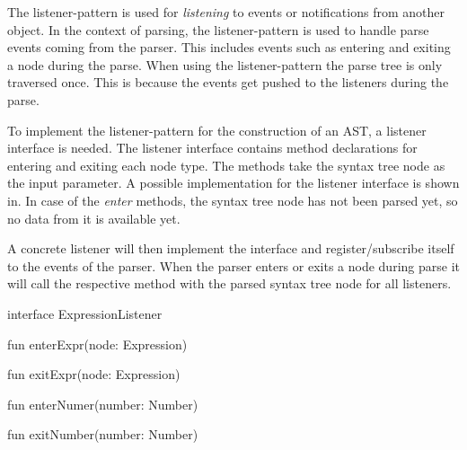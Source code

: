 The listener-pattern is used for \textit{listening} to events or notifications from another object. In the context of parsing, the listener-pattern is used to handle parse events coming from the parser. This includes events such as entering and exiting a node during the parse. When using the listener-pattern the parse tree is only traversed once. This is because the events get pushed to the listeners during the parse. 

To implement the listener-pattern for the construction of an AST, a listener interface is needed. The listener interface contains method declarations for entering and exiting each node type. The methods take the syntax tree node as the input parameter. A possible implementation for the listener interface is shown in.  In case of the \textit{enter} methods, the syntax tree node has not been parsed yet, so no data from it is available yet.

A concrete listener will then implement the interface and register/subscribe itself to the events of the parser. When the parser enters or exits a node during parse it will call the respective method with the parsed syntax tree node for all listeners. 

\begin{KotlinCode}[float,numbers=none,caption=Implementation of the \texttt{ExpressionListener} interface., label=lst:ListPatExprList]
interface ExpressionListener {
    fun enterExpr(node: Expression)

    fun exitExpr(node: Expression)

    fun enterNumer(number: Number)

    fun exitNumber(number: Number)
}
  \end{KotlinCode}

